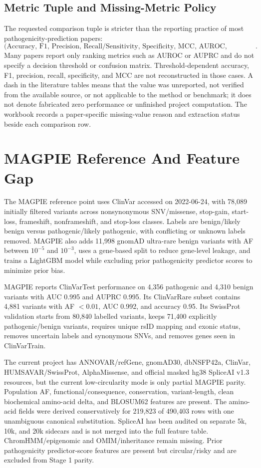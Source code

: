 \documentclass[conference]{IEEEtran}
\begin{document}
\subsection{Metric Tuple and Missing-Metric Policy}
The requested comparison tuple is stricter than the reporting practice of most pathogenicity-prediction papers:
\[
\text{(Accuracy, F1, Precision, Recall/Sensitivity, Specificity, MCC, AUROC, AUPRC, Brier, ECE)}.
\]
Many papers report only ranking metrics such as AUROC or AUPRC and do not specify a decision threshold or confusion matrix. Threshold-dependent accuracy, F1, precision, recall, specificity, and MCC are not reconstructed in those cases. A dash in the literature tables means that the value was unreported, not verified from the available source, or not applicable to the method or benchmark; it does not denote fabricated zero performance or unfinished project computation. The workbook records a paper-specific missing-value reason and extraction status beside each comparison row.

\section{MAGPIE Reference And Feature Gap}
The MAGPIE reference point uses ClinVar accessed on 2022-06-24, with 78,089 initially filtered variants across nonsynonymous SNV/missense, stop-gain, start-loss, frameshift, nonframeshift, and stop-loss classes. Labels are benign/likely benign versus pathogenic/likely pathogenic, with conflicting or unknown labels removed. MAGPIE also adds 11,998 gnomAD ultra-rare benign variants with AF between $10^{-5}$ and $10^{-3}$, uses a gene-based split to reduce gene-level leakage, and trains a LightGBM model while excluding prior pathogenicity predictor scores to minimize prior bias.

MAGPIE reports ClinVarTest performance on 4,356 pathogenic and 4,310 benign variants with AUC 0.995 and AUPRC 0.995. Its ClinVarRare subset contains 4,881 variants with AF $<0.01$, AUC 0.992, and accuracy 0.95. Its SwissProt validation starts from 80,840 labelled variants, keeps 71,400 explicitly pathogenic/benign variants, requires unique rsID mapping and exonic status, removes uncertain labels and synonymous SNVs, and removes genes seen in ClinVarTrain.

The current project has ANNOVAR/refGene, gnomAD30, dbNSFP42a, ClinVar, HUMSAVAR/SwissProt, AlphaMissense, and official masked hg38 SpliceAI v1.3 resources, but the current low-circularity mode is only partial MAGPIE parity. Population AF, functional/consequence, conservation, variant-length, clean biochemical amino-acid delta, and BLOSUM62 features are present. The amino-acid fields were derived conservatively for 219,823 of 490,403 rows with one unambiguous canonical substitution. SpliceAI has been audited on separate 5k, 10k, and 20k sidecars and is not merged into the full feature table. ChromHMM/epigenomic and OMIM/inheritance remain missing. Prior pathogenicity predictor-score features are present but circular/risky and are excluded from Stage 1 parity.
\end{document}
